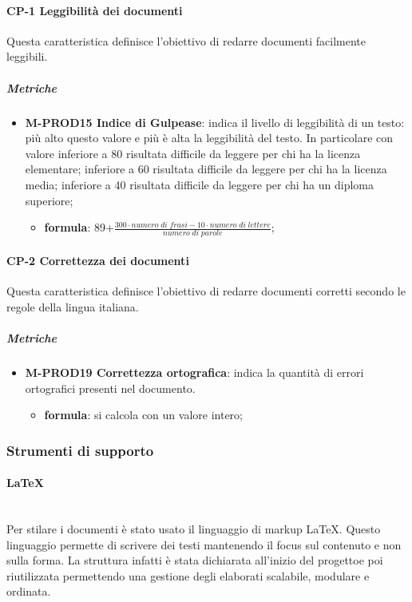         \paragraph{CP-1 Leggibilità dei documenti}
        Questa caratteristica definisce l'obiettivo di redarre documenti facilmente leggibili.
        \subparagraph{Metriche}\mbox{}  
        	  \begin{itemize}
	          	  	\item \textbf{M-PROD15 Indice di Gulpease}: indica il livello di leggibilità di un testo: più alto questo valore e più è alta la leggibilità del testo. In particolare con valore inferiore a 80 risultata difficile da leggere per chi ha la licenza elementare; inferiore a 60 risultata difficile da leggere per chi ha la licenza media; inferiore a 40 risultata difficile da leggere per chi ha un diploma superiore;
	          	  	\begin{itemize}
	          	  		\item[] \textbf{formula}: 89+$\frac{300\cdot numero \; di \; frasi-10\cdot numero \; di \; lettere}{numero \; di \; parole}$;
	          	  	\end{itemize}               
        	  \end{itemize}
      
        \paragraph{CP-2 Correttezza dei documenti}
        Questa caratteristica definisce l'obiettivo di redarre documenti corretti secondo le regole della lingua italiana.
        \subparagraph{Metriche}  
        \begin{itemize}
         	  \item \textbf{M-PROD19 Correttezza ortografica}: indica la quantità di errori ortografici presenti nel documento.
         	  \begin{itemize}
	          	  	\item[] \textbf{formula}: si calcola con un valore intero;
         	  \end{itemize}
	    \end{itemize}
        \subsubsection{Strumenti di supporto}
            \paragraph{\LaTeX}\mbox{}\\ [1mm]
                Per stilare i documenti è stato usato il linguaggio di markup \LaTeX \xspace. Questo linguaggio permette di scrivere dei testi mantenendo il focus
                sul contenuto e non sulla forma. La struttura infatti è stata dichiarata all'inizio del progetto\glosp e poi riutilizzata permettendo una gestione degli elaborati scalabile, modulare e ordinata.
